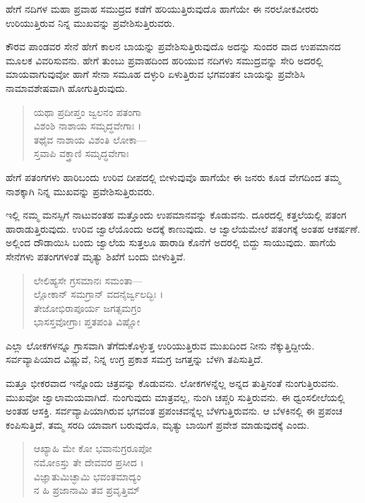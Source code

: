 {\small ಹೇಗೆ ನದಿಗಳ ಮಹಾ ಪ್ರವಾಹ ಸಮುದ್ರದ ಕಡೆಗೆ ಹರಿಯುತ್ತಿರುವುದೊ ಹಾಗೆಯೇ ಈ ನರಲೋಕವೀರರು ಉರಿಯುತ್ತಿರುವ ನಿನ್ನ ಮುಖವನ್ನು ಪ್ರವೇಶಿಸುತ್ತಿರುವರು.}

ಕೌರವ ಪಾಂಡವರ ಸೇನೆ ಹೇಗೆ ಕಾಲನ ಬಾಯನ್ನು ಪ್ರವೇಶಿಸುತ್ತಿರುವುದೊ ಅದನ್ನು ಸುಂದರ ವಾದ ಉಪಮಾನದ ಮೂಲಕ ವಿವರಿಸುವನು. ಹೇಗೆ ತುಂಬು ಪ್ರವಾಹದಿಂದ ಹರಿಯುವ ನದಿಗಳು ಸಮುದ್ರವನ್ನು ಸೇರಿ ಅದರಲ್ಲಿ ಮಾಯವಾಗುವುವೋ ಹಾಗೆ ಸೇನಾ ಸಮೂಹ ದಳ್ಳುರಿ ಏಳುತ್ತಿರುವ ಭಗವಂತನ ಬಾಯನ್ನು ಪ್ರವೇಶಿಸಿ ನಾಮಾವಶೇಷವಾಗಿ ಹೋಗುತ್ತಿರುವುದು.

\begin{verse}
ಯಥಾ ಪ್ರದೀಪ್ತಂ ಜ್ವಲನಂ ಪತಂಗಾ \\ ವಿಶಂಶಿ ನಾಶಾಯ ಸಮೃದ್ಧವೇಗಾಃ ।\\ತಥೈವ ನಾಶಾಯ ವಿಶಂತಿ ಲೋಕಾ—\\ ಸ್ತವಾಪಿ ವಕ್ತ್ರಾಣಿ ಸಮೃದ್ಧವೇಗಾಃ 
\end{verse}

{\small ಹೇಗೆ ಪತಂಗಗಳು ಹಾರಿಬಂದು ಉರಿವ ದೀಪದಲ್ಲಿ ಬೀಳುವುವೊ ಹಾಗೆಯೇ ಈ ಜನರು ಕೂಡ ವೇಗದಿಂದ ತಮ್ಮ ನಾಶಕ್ಕಾಗಿ ನಿನ್ನ ಮುಖವನ್ನು ಪ್ರವೇಶಿಸುತ್ತಿರುವರು.}

ಇಲ್ಲಿ ನಮ್ಮ ಮನಸ್ಸಿಗೆ ನಾಟುವಂತಹ ಮತ್ತೊಂದು ಉಪಮಾನವನ್ನು ಕೊಡುವನು. ದೂರದಲ್ಲಿ ಕತ್ತಲೆಯಲ್ಲಿ ಪತಂಗ ಹಾರಾಡುತ್ತಿರುವುದು. ಉರಿವ ಜ್ವಾಲೆಯೊಂದು ಅದಕ್ಕೆ ಕಾಣುವುದು. ಆ ಜ್ವಾಲೆಯಮೇಲೆ ಪತಂಗಕ್ಕೆ ಅಂತಹ ಆಕರ್ಷಣೆ. ಅಲ್ಲಿಂದ ದೌಡಾಯಿಸಿ ಬಂದು ಜ್ವಾಲೆಯ ಸುತ್ತಲೂ ಹಾರಾಡಿ ಕೊನೆಗೆ ಅದರಲ್ಲಿ ಬಿದ್ದು ಸಾಯುವುದು. ಹಾಗೆಯೆ ಸೇನೆಗಳು ಪತಂಗಗಳಂತೆ ಮೃತ್ಯು ಶಿಖೆಗೆ ಬಂದು ಬೀಳುತ್ತಿವೆ.

\begin{verse}
ಲೇಲಿಹ್ಯಸೇ ಗ್ರಸಮಾನಃ ಸಮಂತಾ—\\ ಲ್ಲೋಕಾನ್ ಸಮಗ್ರಾನ್ ವದನೈರ್ಜ್ವಲದ್ಭಿಃ ।\\ತೇಜೋಭಿರಾಪೂರ್ಯ ಜಗತ್ಸಮಗ್ರಂ \\ ಭಾಸಸ್ತವೋಗ್ರಾಃ ಪ್ತತಪಂತಿ ವಿಷ್ಣೋ 
\end{verse}

{\small ಎಲ್ಲಾ ಲೋಕಗಳನ್ನೂ ಗ್ರಾಸವಾಗಿ ತೆಗೆದುಕೊಳ್ಳುತ್ತ ಉರಿಯುತ್ತಿರುವ ಮುಖದಿಂದ ನೀನು ನೆಕ್ಕುತ್ತಿದ್ದೀಯೆ. ಸರ್ವವ್ಯಾಪಿಯಾದ ವಿಷ್ಣುವೆ, ನಿನ್ನ ಉಗ್ರ ಪ್ರಕಾಶ ಸಮಗ್ರ ಜಗತ್ತನ್ನು ಬೆಳಗಿ ತಪಿಸುತ್ತಿದೆ.}

ಮತ್ತೂ ಭೀಕರವಾದ ಇನ್ನೊಂದು ಚಿತ್ರವನ್ನು ಕೊಡುವನು. ಲೋಕಗಳನ್ನೆಲ್ಲ ಅನ್ನದ ತುತ್ತಿನಂತೆ ನುಂಗುತ್ತಿರುವನು. ಮುಖವೋ ಜ್ವಾಲಾಮಯವಾಗಿದೆ. ನುಂಗುವುದು ಮಾತ್ರವಲ್ಲ, ನುಂಗಿ ಚಪ್ಚರಿ ಸುತ್ತಿರುವನು. ಈ ಧ್ವಂಸಲೀಲೆಯಲ್ಲಿ ಅಂತಹ ಆಸಕ್ತಿ. ಸರ್ವವ್ಯಾಪಿಯಾಗಿರುವ ಭಗವಂತ ಪ್ರಪಂಚವನ್ನೆಲ್ಲ ಬೆಳಗುತ್ತಿರುವನು. ಆ ಬೆಳಕಿನಲ್ಲಿ ಈ ಪ್ರಪಂಚ ಕಂಪಿಸುತ್ತಿದೆ, ತಮ್ಮ ಸರದಿ ಯಾವಾಗ ಬರುವುದೊ, ಮೃತ್ಯು ಬಾಯಿಗೆ ಪ್ರವೇಶ ಮಾಡುವುದಕ್ಕೆ ಎಂದು.

\begin{verse}
ಆಖ್ಯಾಹಿ ಮೇ ಕೋ ಭವಾನುಗ್ರರೂಪೋ \\ ನಮೋಽಸ್ತು ತೇ ದೇವವರ ಪ್ರಸೀದ ।\\ವಿಜ್ಞಾತುಮಿಚ್ಛಾಮಿ ಭವಂತಮಾದ್ಯಂ \\ ನ ಹಿ ಪ್ರಜಾನಾಮಿ ತವ ಪ್ರವೃತ್ತಿಮ್ 
\end{verse}

